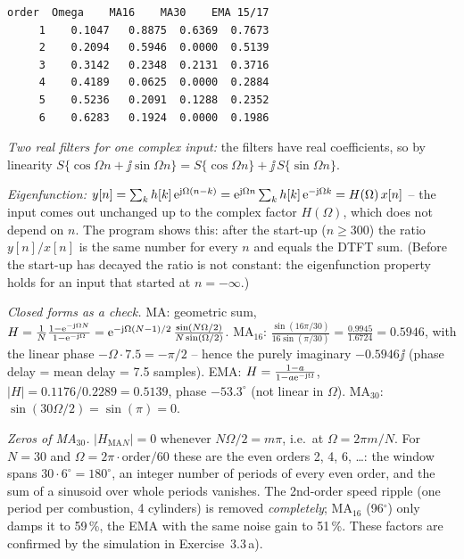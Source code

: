 \begin{solution}
\begin{lstlisting}[style=shell,numbers=none]
    order  Omega    MA16    MA30    EMA 15/17
     1    0.1047   0.8875  0.6369  0.7673
     2    0.2094   0.5946  0.0000  0.5139
     3    0.3142   0.2348  0.2131  0.3716
     4    0.4189   0.0625  0.0000  0.2884
     5    0.5236   0.2091  0.1288  0.2352
     6    0.6283   0.1924  0.0000  0.1986
\end{lstlisting}
\emph{Two real filters for one complex input:} the filters have real
coefficients, so by linearity
$S\{\cos\Omega n+\jj\sin\Omega n\}=S\{\cos\Omega n\}+\jj\,S\{\sin\Omega n\}$.

\emph{Eigenfunction:}
$y[n]=\sum_k h[k]\,\mathrm{e}^{\mathrm{j}\Omega(n-k)}=\mathrm{e}^{\mathrm{j}\Omega n}\sum_k h[k]\,\mathrm{e}^{-\mathrm{j}\Omega k}
=H(\Omega)\,x[n]$ -- the input comes out unchanged up to the complex factor
$H(\Omega)$, which does not depend on $n$. The program shows this: after the
start-up ($n\ge300$) the ratio $y[n]/x[n]$ is the same number for every $n$ and
equals the DTFT sum. (Before the start-up has decayed the ratio is not constant:
the eigenfunction property holds for an input that started at $n=-\infty$.)

\emph{Closed forms as a check.} MA: geometric sum,
$H=\frac{1}{N}\frac{1-\mathrm{e}^{-\mathrm{j}\Omega N}}{1-\mathrm{e}^{-\mathrm{j}\Omega}}
=\mathrm{e}^{-\mathrm{j}\Omega(N-1)/2}\,\frac{\sin(N\Omega/2)}{N\sin(\Omega/2)}$. MA$_{16}$:
$\frac{\sin(16\pi/30)}{16\sin(\pi/30)}=\frac{0.9945}{1.6724}=0.5946$, with the
linear phase $-\Omega\cdot7.5=-\pi/2$ -- hence the purely imaginary $-0.5946\jj$
(phase delay = mean delay = 7.5 samples). EMA:
$H=\frac{1-a}{1-a\mathrm{e}^{-\mathrm{j}\Omega}}$, $|H|=0.1176/0.2289=0.5139$, phase
$-53.3^\circ$ (not linear in $\Omega$). MA$_{30}$: $\sin(30\Omega/2)=\sin(\pi)=0$.

\emph{Zeros of MA$_{30}$.} $|H_{\text{MA}N}|=0$ whenever $N\Omega/2=m\pi$, i.e.\ at
$\Omega=2\pi m/N$. For $N=30$ and $\Omega=2\pi\cdot\text{order}/60$ these are the
even orders 2, 4, 6, \dots: the window spans $30\cdot6^\circ=180^\circ$, an
integer number of periods of every even order, and the sum of a sinusoid over
whole periods vanishes. The 2nd-order speed ripple (one period per combustion,
4 cylinders) is removed \emph{completely}; MA$_{16}$ (96$^\circ$) only damps it
to 59\,\%, the EMA with the same noise gain to 51\,\%. These factors are
confirmed by the simulation in Exercise~3.3\,a).
\end{solution}

